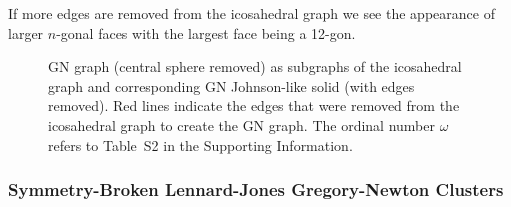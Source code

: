 If more edges are removed from the icosahedral graph we see the appearance of
larger $n$-gonal faces with the largest face being a 12-gon.
\begin{figure}[htb]
    \centering
    \caption{GN graph (central sphere removed) as subgraphs of the icosahedral graph and corresponding 
    GN Johnson-like solid (with edges removed). Red lines indicate the edges that were removed 
    from the icosahedral graph to create the GN graph.
    The ordinal number $\omega$ refers to Table~S2 in the Supporting Information.}
    \label{fig:GNJohnsongraph}
\end{figure}

\subsubsection{Symmetry-Broken Lennard-Jones Gregory-Newton Clusters}

